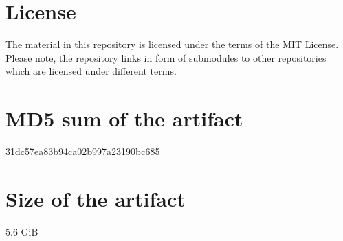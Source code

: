 \documentclass[a4paper,USenglish]{darts-v2019}
\newcommand{\license}[1]{{\section{License}#1}}
\newcommand{\mdsum}[1]{{\section{MD5 sum of the artifact}#1}}
\newcommand{\artifactsize}[1]{{\section{Size of the artifact}#1}}
\begin{document}
\license{The material in this repository is licensed under the terms of the MIT License. Please note, the repository links in form of submodules to other repositories which are licensed under different terms.}

\mdsum{31dc57ea83b94ca02b997a23190bc685}

\artifactsize{5.6 GiB}





% 

\end{document}

